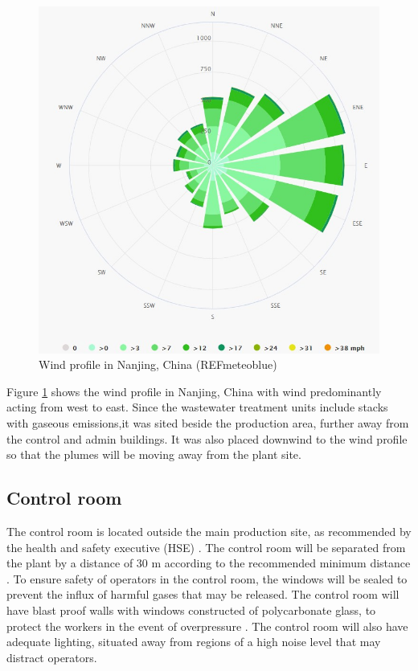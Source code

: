 \begin{figure}
\centering
\includegraphics[width=\linewidth]{chapters/5-safety-layout-environment/figures/Windrose_profile.jpg}
\caption{Wind profile in Nanjing, China (REFmeteoblue)}
\label{fig:wind}
\end{figure}


Figure \ref{fig:wind} shows the wind profile in Nanjing, China with wind predominantly acting from west to east. Since the wastewater treatment units include stacks with gaseous emissions,it was sited beside the production area, further away from the control and admin buildings. It was also placed downwind to the wind profile so that the plumes will be moving away from the plant site. 



\subsection{Control room}

The control room is located outside the main production site, as recommended by the health and safety executive (HSE) \cite{health_and_safety_executive_control_nodate}. The control room will be separated from the plant by a distance of 30 m according to the recommended minimum distance \cite{mannan_lees_2012}. To ensure safety of operators in the control room, the windows will be sealed to prevent the influx of harmful gases that may be released. The control room will have blast proof walls with windows constructed of polycarbonate glass, to protect the workers in the event of overpressure \cite{health_and_safety_executive_control_nodate}. The control room will also have adequate lighting, situated away from regions of a high noise level that may distract operators.

